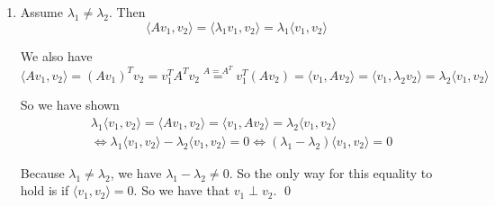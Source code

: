 \documentclass[12pt]{article}
\begin{document}
\begin{enumerate}[label=\alph*)]
    \begin{itemize}
        \item \underline{$\ker(A) \subseteq \ker(A^T A)$}. Take $x \in \ker(A)$. Then
        $$
            A x = 0 \implies A^T A x = 0 \iff x \in \ker(A^T A)
        $$
        So $x \in \ker(A) \implies x \in \ker(A^T A)$. Therefore, $\ker(A) \subseteq \ker(A^T A)$ holds.
        \item \underline{$\ker(A^T A) \subseteq \ker(A)$}: Take $x \in \ker(A^T A)$. Then
        $$
            A^T A x = 0 \iff x^T A^T A x = x^T \cdot 0 \iff (A x)^T A x = 0
        $$
        $$
            \iff \lVert A x \rVert^2 = 0 \iff \lVert A x \rVert = 0 \iff \sqrt{\langle A x, A x \rangle} = 0
        $$

        By the positivity of the inner product, this implies that $A x$ must be equal to zero. So $x \in \ker(A)$. We have shown that $\ker(A^T A) \subseteq \ker(A)$.
    \end{itemize}

    Because $\ker(A) \subseteq \ker(A^T A)$ and $\ker(A^T A) \subseteq \ker(A)$ both hold, we have shown that $\ker(A^T A) = \ker(A)$. This clearly implies that $\dim\ker(A^T A) = \dim\ker(A)$. By the above chain of implications, this means that $\mathrm{rank}(A^T A) = \mathrm{rank}(A)$.

    \item Assume $\lambda_1 \neq \lambda_2$. Then
    $$
        \langle A v_1, v_2 \rangle = \langle \lambda_1 v_1, v_2 \rangle = \lambda_1 \langle v_1, v_2 \rangle
    $$

    We also have
    $$
        \langle A v_1, v_2 \rangle = (Av_1)^T v_2 = v_1^T A^T v_2 \overset{A = A^T}= v_1^T (A v_2) = \langle v_1, A v_2 \rangle = \langle v_1, \lambda_2 v_2 \rangle = \lambda_2 \langle v_1, v_2 \rangle
    $$

    So we have shown
    $$
    \begin{aligned}
        &\lambda_1 \langle v_1, v_2 \rangle = \langle A v_1, v_2 \rangle = \langle v_1, A v_2 \rangle = \lambda_2 \langle v_1, v_2 \rangle \\
        &\iff \lambda_1 \langle v_1, v_2 \rangle - \lambda_2 \langle v_1, v_2 \rangle = 0 \iff (\lambda_1 - \lambda_2) \langle v_1, v_2 \rangle = 0
    \end{aligned}
    $$

    Because $\lambda_1 \neq \lambda_2$, we have $\lambda_1 - \lambda_2 \neq 0$. So the only way for this equality to hold is if $\langle v_1, v_2 \rangle = 0$. So we have that $v_1 \perp v_2$. \qed
\end{enumerate}
\end{document}

